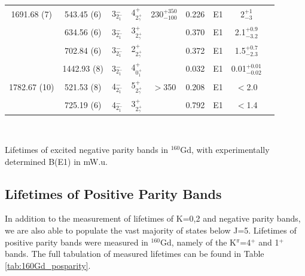 \begin{table}[h!]
\begin{center}
\begin{tabular}{ccccccccc}
\hline
1691.68 (7)  &  543.45 (6) & 3$^-_{2^-_1}$ & 4$^+_{2^+_\gamma}$ & 230$^{+350}_{-100}$ & 0.226 & E1   & 2$^{+1}_{-3}$ &\\
             &  634.56 (6) & 3$^-_{2^-_1}$ & 3$^+_{2^+_\gamma}$ &                     & 0.370 & E1   & 2.1$^{+0.9}_{-3.2}$ &\\
             &  702.84 (6) & 3$^-_{2^-_1}$ & 2$^+_{2^+_\gamma}$ &                     & 0.372 & E1   & 1.5$^{+0.7}_{-2.3}$ &\\
             & 1442.93 (8) & 3$^-_{2^-_1}$ & 4$^+_{0^+_1}$ &                          & 0.032 & E1   & 0.01$^{+0.01}_{-0.02}$ &\\
1782.67 (10) &  521.53 (8) & 4$^-_{2^-_1}$ & 5$^+_{2^+_\gamma}$ & $>$350              & 0.208 & E1   & $<$2.0 &\\
             &  725.19 (6) & 4$^-_{2^-_1}$ & 3$^+_{2^+_\gamma}$ &                     & 0.792 & E1   & $<$1.4 &\\
\end{tabular}\\ \vspace{10pt}
\end{center}
Lifetimes of excited negative parity bands in $^{160}$Gd, with experimentally determined B(E1) in mW.u. 
\end{table}

\subsection{Lifetimes of Positive Parity Bands}
In addition to the measurement of lifetimes of K=0,2 and negative parity bands, we are also able to populate the vast majority of states below J=5. Lifetimes of positive parity bands were measured in $^{160}$Gd, namely of the K$^\pi$=4$^+$ and 1$^+$ bands. The full tabulation of measured lifetimes can be found in Table \ref{tab:160Gd_posparity}.


